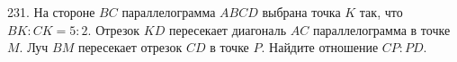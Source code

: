 231. На стороне $BC$ параллелограмма $ABCD$ выбрана точка $K$ так, что $BK:CK=5:2.$ Отрезок $KD$ пересекает диагональ $AC$ параллелограмма в точке $M.$ Луч $BM$ пересекает отрезок $CD$ в точке $P.$ Найдите отношение $CP:PD.$\\
